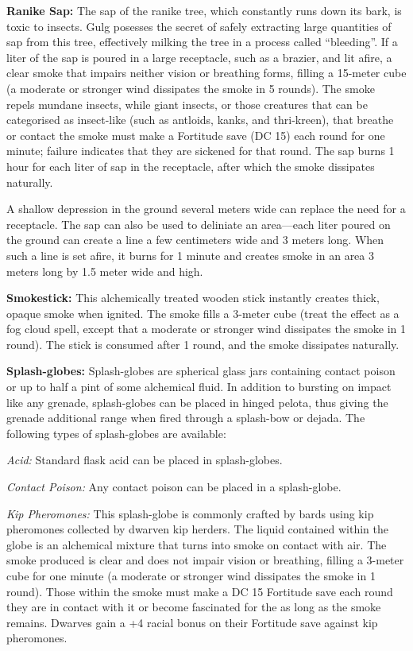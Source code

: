 \textbf{Ranike Sap:} The sap of the ranike tree, which constantly runs down its bark, is toxic to insects. Gulg posesses the secret of safely extracting large quantities of sap from this tree, effectively milking the tree in a process called ``bleeding''. If a liter of the sap is poured in a large receptacle, such as a brazier, and lit afire, a clear smoke that impairs neither vision or breathing forms, filling a 15-meter cube (a moderate or stronger wind dissipates the smoke in 5 rounds). The smoke repels mundane insects, while giant insects, or those creatures that can be categorised as insect-like (such as antloids, kanks, and thri-kreen), that breathe or contact the smoke must make a Fortitude save (DC 15) each round for one minute; failure indicates that they are sickened for that round. The sap burns 1 hour for each liter of sap in the receptacle, after which the smoke dissipates naturally.

A shallow depression in the ground several meters wide can replace the need for a receptacle. The sap can also be used to deliniate an area---each liter poured on the ground can create a line a few centimeters wide and 3 meters long. When such a line is set afire, it burns for 1 minute and creates smoke in an area 3 meters long by 1.5 meter wide and high.

\textbf{Smokestick:} This alchemically treated wooden stick instantly creates thick, opaque smoke when ignited. The smoke fills a 3-meter cube (treat the effect as a fog cloud spell, except that a moderate or stronger wind dissipates the smoke in 1 round). The stick is consumed after 1 round, and the smoke dissipates naturally.

\textbf{Splash-globes:} Splash-globes are spherical glass jars containing contact poison or up to half a pint of some alchemical fluid. In addition to bursting on impact like any grenade, splash-globes can be placed in hinged pelota, thus giving the grenade additional range when fired through a splash-bow or dejada. The following types of splash-globes are available:

 \textit{Acid:} Standard flask acid can be placed in splash-globes.

 \textit{Contact Poison:} Any contact poison can be placed in a splash-globe.

 \textit{Kip Pheromones:} This splash-globe is commonly crafted by bards using kip pheromones collected by dwarven kip herders. The liquid contained within the globe is an alchemical mixture that turns into smoke on contact with air. The smoke produced is clear and does not impair vision or breathing, filling a 3-meter cube for one minute (a moderate or stronger wind dissipates the smoke in 1 round). Those within the smoke must make a DC 15 Fortitude save each round they are in contact with it or become fascinated for the as long as the smoke remains. Dwarves gain a +4 racial bonus on their Fortitude save against kip pheromones.

